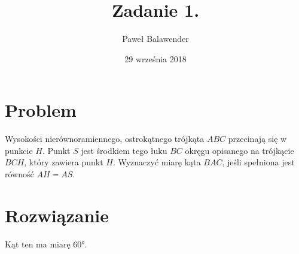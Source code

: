 \documentclass[12pt]{article}
\title{Zadanie 1.}
\date{29 września 2018}
\author{Paweł Balawender}
\begin{document}
\maketitle

\section*{Problem}
\begin{justify}
Wysokości nierównoramiennego, ostrokątnego trójkąta $ABC$ przecinają się \linebreak
w punkcie $H$. Punkt $S$ jest środkiem tego łuku $BC$ okręgu opisanego na trójkącie
$BCH$, który zawiera punkt $H$. Wyznaczyć miarę kąta $BAC$, jeśli spełniona jest
równość $AH = AS$.

\section*{Rozwiązanie}

Kąt ten ma miarę \ang{60}.


\end{justify}
\end{document}
